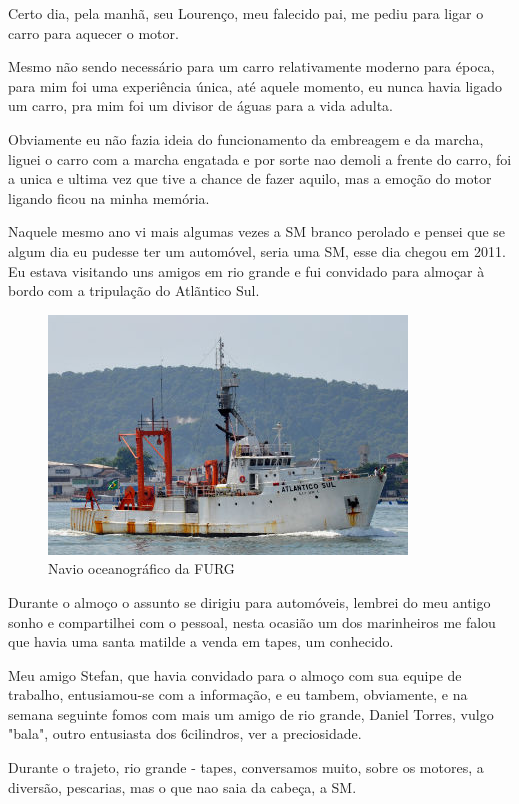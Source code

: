 \documentclass[a4paper]{report}
\begin{document}
Certo dia, pela manh\~a, seu Louren\c{c}o, meu falecido pai, me pediu para ligar o carro para aquecer o motor.

Mesmo n\~ao sendo necess\'ario para um carro relativamente moderno para \'epoca, para mim foi uma experi\^encia \'unica,
at\'e aquele momento, eu nunca havia ligado um carro, pra mim foi um divisor de \'aguas para a vida adulta.

Obviamente eu n\~ao fazia ideia do funcionamento da embreagem e da marcha, liguei o carro com a marcha engatada e por sorte
nao demoli a frente do carro, foi a unica e ultima vez que tive a chance de fazer aquilo, mas a emo\c{c}\~ao do motor ligando ficou
na minha mem\'oria. 

Naquele mesmo ano vi mais algumas vezes a SM branco perolado e pensei que se algum dia eu pudesse ter um
autom\'ovel, seria uma SM, esse dia chegou em 2011.
\clearpage
Eu estava visitando uns amigos em rio grande e fui convidado para almo\c{c}ar \`a bordo com a tripula\c{c}\~ao do Atl\~antico Sul.

\begin{figure}[!htb]
\centering
\includegraphics{atsul}
\caption{Navio oceanogr\'afico da FURG}
\label{at_sul}
\end{figure}

Durante o almo\c{c}o o assunto se dirigiu para autom\'oveis, lembrei do meu antigo sonho e compartilhei com o pessoal, nesta ocasi\~ao um dos marinheiros
me falou que havia uma santa matilde a venda em tapes, um conhecido.

Meu amigo Stefan, que havia convidado para o almo\c{c}o com sua equipe de trabalho, entusiamou-se com a informa\c{c}\~ao, e eu tambem, obviamente, e na semana 
seguinte fomos com mais um amigo de rio grande, Daniel Torres, vulgo "bala", outro entusiasta dos 6cilindros, ver a preciosidade.

Durante o trajeto, rio grande - tapes, conversamos muito, sobre os motores, a divers\~ao, pescarias, mas o que nao saia da cabe\c{c}a, a SM.   
\clearpage
{}
\end{document}
